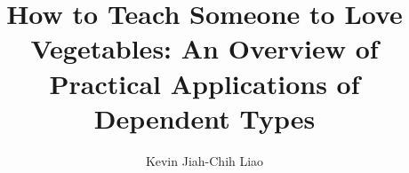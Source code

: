 \documentclass[a4paper,12pt,twoside]{report}
\begin{document}
\title{\LARGE {\bf How to Teach Someone to Love Vegetables: An Overview of Practical Applications of Dependent Types}\\
 \vspace*{6mm}
}

\author{Kevin Jiah-Chih Liao}

\normallinespacing
\maketitle

\preface

% 
%
% 
\body




\appendix




\end{document}
